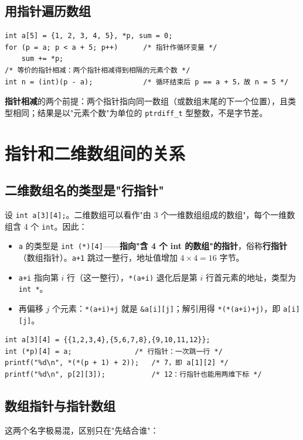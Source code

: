 \subsection{用指针遍历数组}
\begin{lstlisting}
int a[5] = {1, 2, 3, 4, 5}, *p, sum = 0;
for (p = a; p < a + 5; p++)      /* 指针作循环变量 */
    sum += *p;
/* 等价的指针相减：两个指针相减得到相隔的元素个数 */
int n = (int)(p - a);            /* 循环结束后 p == a + 5，故 n = 5 */
\end{lstlisting}
\textbf{指针相减}的两个前提：两个指针指向同一数组（或数组末尾的下一个位置），且类型相同；结果是以"元素个数"为单位的 \texttt{ptrdiff\_t} 型整数，不是字节差。


\section{指针和二维数组间的关系}
\subsection{二维数组名的类型是"行指针"}
设 \texttt{int a[3][4];}。二维数组可以看作"由 3 个一维数组组成的数组"，每个一维数组含 4 个 \texttt{int}。因此：
\begin{itemize}
  \item \texttt{a} 的类型是 \texttt{int (*)[4]}——\textbf{指向"含 4 个 int 的数组"的指针}，俗称\textbf{行指针}（数组指针）。\texttt{a+1} 跳过一整行，地址值增加 $4\times4=16$ 字节。
  \item \texttt{a+i} 指向第 $i$ 行（这一整行），\texttt{*(a+i)} 退化后是第 $i$ 行首元素的地址，类型为 \texttt{int *}。
  \item 再偏移 $j$ 个元素：\texttt{*(a+i)+j} 就是 \texttt{\&a[i][j]}；解引用得 \texttt{*(*(a+i)+j)}，即 \texttt{a[i][j]}。
\end{itemize}
\begin{lstlisting}
int a[3][4] = {{1,2,3,4},{5,6,7,8},{9,10,11,12}};
int (*p)[4] = a;               /* 行指针：一次跳一行 */
printf("%d\n", *(*(p + 1) + 2));   /* 7，即 a[1][2] */
printf("%d\n", p[2][3]);           /* 12：行指针也能用两维下标 */
\end{lstlisting}

\subsection{数组指针与指针数组}
这两个名字极易混，区别只在"先结合谁"：

